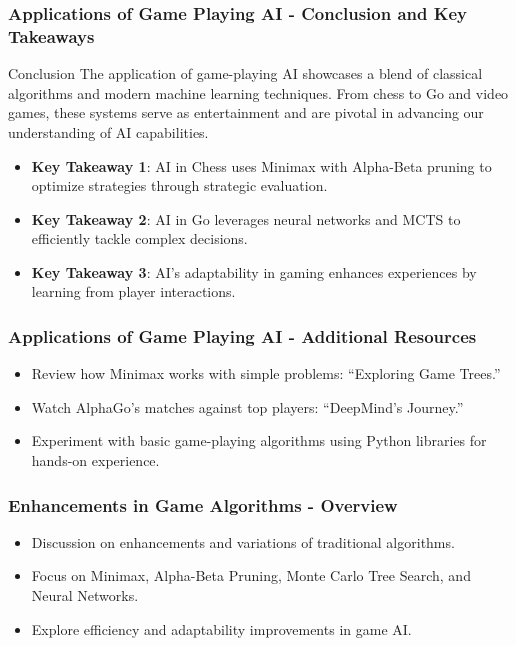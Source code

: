 \documentclass[aspectratio=169]{beamer}
\begin{document}
\begin{frame}[fragile]
    \frametitle{Applications of Game Playing AI - Conclusion and Key Takeaways}
    \begin{block}{Conclusion}
        The application of game-playing AI showcases a blend of classical algorithms and modern machine learning techniques. From chess to Go and video games, these systems serve as entertainment and are pivotal in advancing our understanding of AI capabilities.
    \end{block}

    \begin{itemize}
        \item \textbf{Key Takeaway 1}: AI in Chess uses Minimax with Alpha-Beta pruning to optimize strategies through strategic evaluation.
        \item \textbf{Key Takeaway 2}: AI in Go leverages neural networks and MCTS to efficiently tackle complex decisions.
        \item \textbf{Key Takeaway 3}: AI's adaptability in gaming enhances experiences by learning from player interactions.
    \end{itemize}
\end{frame}

\begin{frame}[fragile]
    \frametitle{Applications of Game Playing AI - Additional Resources}
    \begin{itemize}
        \item Review how Minimax works with simple problems: “Exploring Game Trees.”
        \item Watch AlphaGo's matches against top players: “DeepMind’s Journey.”
        \item Experiment with basic game-playing algorithms using Python libraries for hands-on experience.
    \end{itemize}
\end{frame}

\begin{frame}[fragile]
    \frametitle{Enhancements in Game Algorithms - Overview}
    \begin{itemize}
        \item Discussion on enhancements and variations of traditional algorithms.
        \item Focus on Minimax, Alpha-Beta Pruning, Monte Carlo Tree Search, and Neural Networks.
        \item Explore efficiency and adaptability improvements in game AI.
    \end{itemize}
\end{frame}
\end{document}
